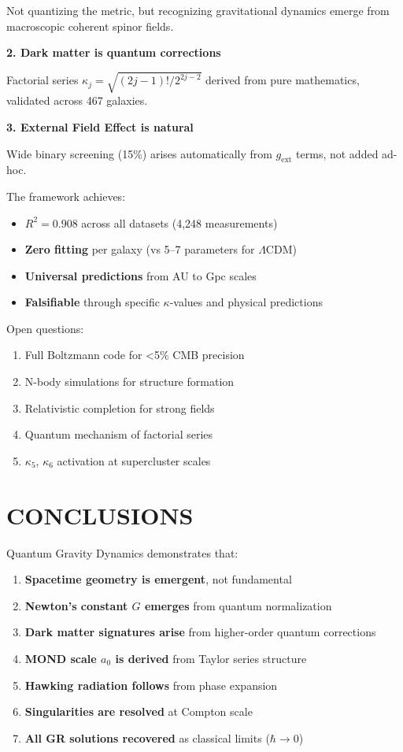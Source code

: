 \documentclass[11pt,a4paper]{article}
\theoremstyle{definition}
\theoremstyle{remark}
\begin{document}
	Not quantizing the metric, but recognizing gravitational dynamics emerge from macroscopic coherent spinor fields.
	
	\textbf{2. Dark matter is quantum corrections}
	
	Factorial series $\kappa_j = \sqrt{(2j-1)!/2^{2j-2}}$ derived from pure mathematics, validated across 467 galaxies.
	
	\textbf{3. External Field Effect is natural}
	
	Wide binary screening (15\%) arises automatically from $g_{\text{ext}}$ terms, not added ad-hoc.
	
	The framework achieves:
	\begin{itemize}
		\item \textbf{$R^2 = 0.908$} across all datasets (4,248 measurements)
		\item \textbf{Zero fitting} per galaxy (vs 5--7 parameters for $\Lambda$CDM)
		\item \textbf{Universal predictions} from AU to Gpc scales
		\item \textbf{Falsifiable} through specific $\kappa$-values and physical predictions
	\end{itemize}
	
	Open questions:
	\begin{enumerate}
		\item Full Boltzmann code for <5\% CMB precision
		\item N-body simulations for structure formation
		\item Relativistic completion for strong fields
		\item Quantum mechanism of factorial series
		\item $\kappa_5$, $\kappa_6$ activation at supercluster scales
	\end{enumerate}
	
	\section{CONCLUSIONS}
	\label{sec:conclusions}
	
	Quantum Gravity Dynamics demonstrates that:
	
	\begin{enumerate}
		\item \textbf{Spacetime geometry is emergent}, not fundamental
		\item \textbf{Newton's constant $G$ emerges} from quantum normalization
		\item \textbf{Dark matter signatures arise} from higher-order quantum corrections
		\item \textbf{MOND scale $a_0$ is derived} from Taylor series structure
		\item \textbf{Hawking radiation follows} from phase expansion
		\item \textbf{Singularities are resolved} at Compton scale
		\item \textbf{All GR solutions recovered} as classical limits ($\hbar \to 0$)
	\end{enumerate}
	
\end{document}
